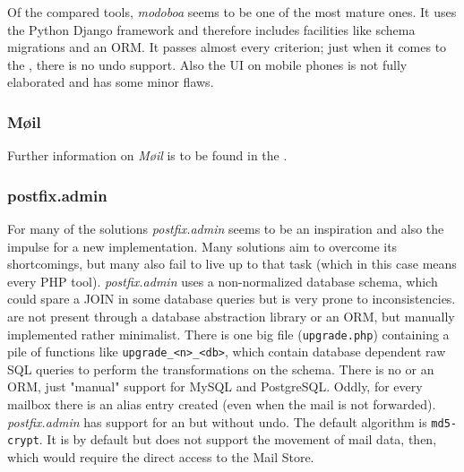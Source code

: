 \documentclass[12pt,a4paper]{scrartcl}
\begin{document}
				\noindent
				Of the compared tools, \emph{modoboa} seems to be one of the
				most mature ones. It uses the Python Django framework and
				therefore includes facilities like schema migrations and an
				\ac{ORM}. It passes almost every criterion; just when it comes
				to the , there is no undo support.
				Also the \ac{UI} on mobile phones is not fully elaborated and
				has some minor flaws.

			\subsubsection{Møil}
				
				\noindent
				Further information on \emph{Møil} is to be found in the
				.

			\subsubsection{postfix.admin}
			\label{sec:contestants:postfix.admin}

				\noindent
				For many of the solutions \emph{postfix.admin} seems to be an
				inspiration and also the impulse for a new implementation. Many
				solutions aim to overcome its shortcomings, but many also fail
				to live up to that task (which in this case means every PHP
				tool). \emph{postfix.admin} uses a non-normalized \cite{dbnorm}
				database schema, which could spare a JOIN in some database
				queries but is very prone to inconsistencies.  are not present through a database abstraction
				library or an \ac{ORM}, but manually implemented rather
				minimalist. There is one big file (\texttt{upgrade.php})
				containing a pile of functions like
				\texttt{upgrade\_<n>\_<db>}, which contain database dependent
				raw \ac{SQL} queries to perform the transformations on the
				schema. There is no  or an \ac{ORM}, just "manual" support for
				MySQL and PostgreSQL. Oddly, for every mailbox there is an
				alias entry created (even when the mail is not forwarded).
				\emph{postfix.admin} has support for an  but without undo. The default  algorithm is \texttt{md5-crypt}. It is
				 by default but does not support the
				movement of mail data, then, which would require the direct
				access to the Mail Store.
\end{document}
